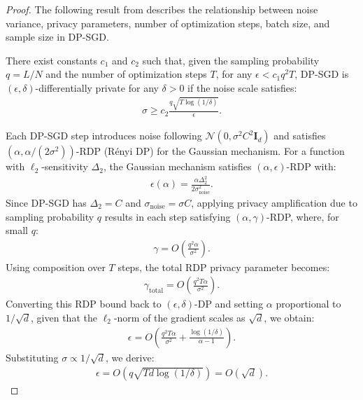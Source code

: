 \begin{proof}
    The following result from \citet{dgsgd} describes the relationship between noise variance, privacy parameters, number of optimization steps, batch size, and sample size in DP-SGD.

\begin{theorem*}
    There exist constants \( c_1 \) and \( c_2 \) such that, given the sampling probability \( q = L / N \) and the number of optimization steps \( T \), for any \( \epsilon < c_1 q^2 T \), DP-SGD is \( (\epsilon, \delta) \)-differentially private for any \( \delta > 0 \) if the noise scale satisfies:
    \begin{align}
        \sigma \geq c_2 \frac{q \sqrt{T \log (1 / \delta)}}{\epsilon}.
    \end{align}
\end{theorem*}

Each DP-SGD step introduces noise following \( \mathcal{N}\left(0, \sigma^2 C^2 \mathbf{I}_d\right) \) and satisfies \( (\alpha, \alpha / (2 \sigma^2)) \)-RDP (Rényi DP) for the Gaussian mechanism. For a function with \( \ell_2 \)-sensitivity \( \Delta_2 \), the Gaussian mechanism satisfies \( (\alpha, \epsilon) \)-RDP with:
\begin{align}
    \epsilon(\alpha) = \frac{\alpha \Delta_2^2}{2 \sigma_{\text{noise}}^2}.
\end{align}
Since DP-SGD has \( \Delta_2 = C \) and \( \sigma_{\text{noise}} = \sigma C \), applying privacy amplification due to sampling probability \( q \) results in each step satisfying \( (\alpha, \gamma) \)-RDP, where, for small \( q \):
\begin{align}
    \gamma = O\left(\frac{q^2 \alpha}{\sigma^2}\right).
\end{align}
Using composition over \( T \) steps, the total RDP privacy parameter becomes:
\begin{align}
    \gamma_{\text{total}} = O\left(\frac{q^2 T \alpha}{\sigma^2}\right).
\end{align}
Converting this RDP bound back to \( (\epsilon, \delta) \)-DP and setting \( \alpha \) proportional to \( 1 / \sqrt{d} \), given that the \( \ell_2 \)-norm of the gradient scales as \( \sqrt{d} \), we obtain:
\begin{align}
    \epsilon = O\left(\frac{q^2 T \alpha}{\sigma^2} + \frac{\log (1 / \delta)}{\alpha - 1}\right).
\end{align}
Substituting \( \sigma \propto 1 / \sqrt{d} \), we derive:
\begin{align}
    \epsilon = O(q \sqrt{T d \log (1 / \delta)}) = O(\sqrt{d}).
\end{align}
\end{proof}


